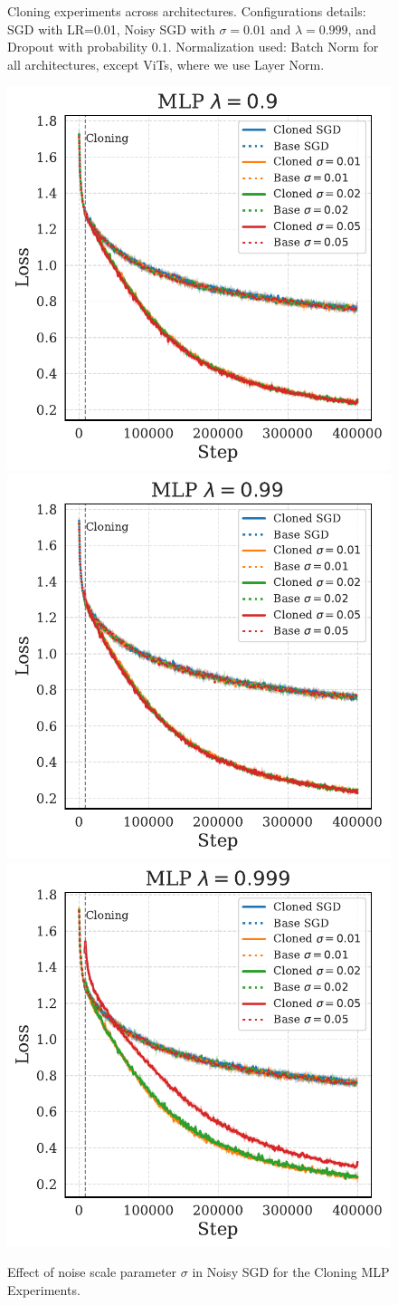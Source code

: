 \documentclass{article}
\numberwithin{figure}{section}
\begin{document}
\begin{figure}
    \caption{Cloning experiments across architectures. Configurations details: SGD with LR=0.01, Noisy SGD with $\sigma = 0.01$ and $\lambda = 0.999$, and Dropout with probability $0.1$. Normalization used: Batch Norm for all architectures, except ViTs, where we use Layer Norm.}
    \label{fig:enter-label}
\end{figure}


\begin{figure}
    \centering
    \includegraphics[width=0.3\linewidth]{paper/images/mlp_noises_cloning_losses_plot_sigma_lambda_0.9.pdf}
    \includegraphics[width=0.3\linewidth]{paper/images/mlp_noises_cloning_losses_plot_sigma_lambda_0.99.pdf}
    \includegraphics[width=0.3\linewidth]{paper/images/mlp_noises_cloning_losses_plot_sigma_lambda_0.999.pdf}
    \caption{Effect of noise scale parameter $\sigma$ in Noisy SGD for the Cloning MLP Experiments.}
    \label{fig:enter-label}
\end{figure}
\end{document}

